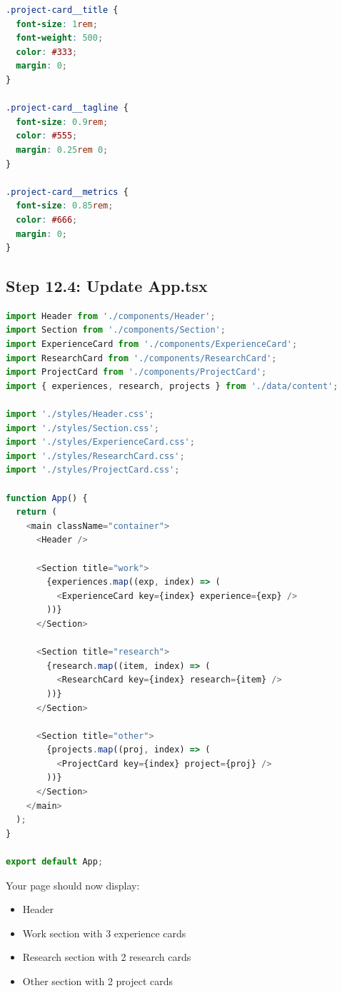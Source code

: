 \documentclass[12pt,a4paper]{article}
\begin{document}
\begin{lstlisting}[language=CSS,caption={src/styles/ProjectCard.css}]
.project-card__title {
  font-size: 1rem;
  font-weight: 500;
  color: #333;
  margin: 0;
}

.project-card__tagline {
  font-size: 0.9rem;
  color: #555;
  margin: 0.25rem 0;
}

.project-card__metrics {
  font-size: 0.85rem;
  color: #666;
  margin: 0;
}
\end{lstlisting}

\subsection{Step 12.4: Update App.tsx}

\begin{lstlisting}[language=JavaScript,caption={src/App.tsx - Complete version}]
import Header from './components/Header';
import Section from './components/Section';
import ExperienceCard from './components/ExperienceCard';
import ResearchCard from './components/ResearchCard';
import ProjectCard from './components/ProjectCard';
import { experiences, research, projects } from './data/content';

import './styles/Header.css';
import './styles/Section.css';
import './styles/ExperienceCard.css';
import './styles/ResearchCard.css';
import './styles/ProjectCard.css';

function App() {
  return (
    <main className="container">
      <Header />

      <Section title="work">
        {experiences.map((exp, index) => (
          <ExperienceCard key={index} experience={exp} />
        ))}
      </Section>

      <Section title="research">
        {research.map((item, index) => (
          <ResearchCard key={index} research={item} />
        ))}
      </Section>

      <Section title="other">
        {projects.map((proj, index) => (
          <ProjectCard key={index} project={proj} />
        ))}
      </Section>
    </main>
  );
}

export default App;
\end{lstlisting}

\begin{checkpoint}
Your page should now display:
\begin{itemize}
    \item[$\square$] Header
    \item[$\square$] Work section with 3 experience cards
    \item[$\square$] Research section with 2 research cards
    \item[$\square$] Other section with 2 project cards
\end{itemize}
\end{checkpoint}
\end{document}
